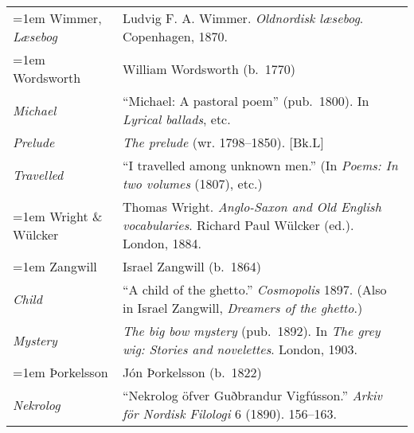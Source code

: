 \begin{xltabular}{\textwidth}{ lQ }
\hangindent=1em  Wimmer, \textit{Læsebog} & Ludvig F. A. Wimmer. \textit{Oldnordisk læsebog}. Copenhagen, 1870. \\

\hangindent=1em  Wordsworth & William Wordsworth (b.~1770) \\
\hspace{1em}\textit{Michael} & ``Michael: A pastoral poem''  (pub.~1800). In \textit{Lyrical ballads}, etc. \\
\hspace{1em}\textit{Prelude} & \textit{The prelude} (wr. 1798--1850). [Bk.L] \\
\hspace{1em}\textit{Travelled} & ``I travelled among unknown men.'' (In \textit{Poems: In two volumes} (1807), etc.) \\

\hangindent=1em  Wright \& Wülcker & Thomas Wright. \textit{Anglo-Saxon and Old English vocabularies}. Richard Paul Wülcker (ed.). London, 1884.\\ %

\hangindent=1em  Zangwill & Israel Zangwill (b.~1864)\\
\hspace{1em}\textit{Child} & ``A child of the ghetto.'' \textit{Cosmopolis} 1897. (Also in Israel Zangwill, \textit{Dreamers of the ghetto}.) \\ %
\hspace{1em}\textit{Mystery} & \textit{The big bow mystery} (pub.~1892). In \textit{The grey wig: Stories and novelettes}. London, 1903.\\

\pagebreak
\hangindent=1em  Þorkelsson & Jón Þorkelsson (b.~1822)\\
\hspace{1em}\textit{Nekrolog} & ``Nekrolog öfver Guðbrandur Vigfússon.'' \textit{Arkiv för Nordisk Filologi} 6 (1890). 156--163.\\
\end{xltabular}
